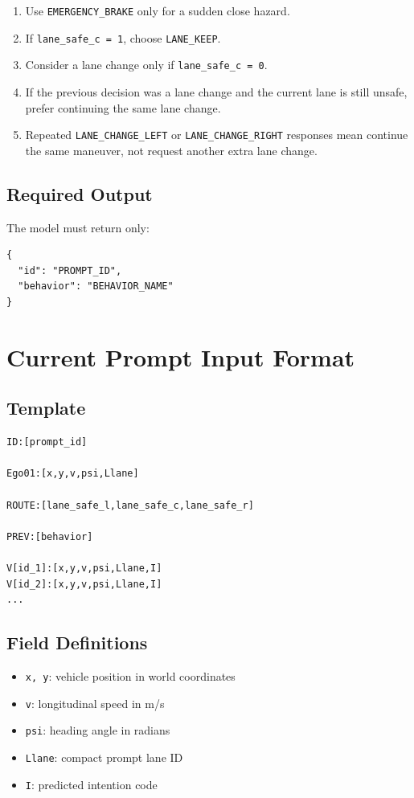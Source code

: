 \documentclass[11pt]{article}
\begin{document}
\begin{enumerate}
    \item Use \texttt{EMERGENCY\_BRAKE} only for a sudden close hazard.
    \item If \texttt{lane\_safe\_c = 1}, choose \texttt{LANE\_KEEP}.
    \item Consider a lane change only if \texttt{lane\_safe\_c = 0}.
    \item If the previous decision was a lane change and the current lane is
    still unsafe, prefer continuing the same lane change.
    \item Repeated \texttt{LANE\_CHANGE\_LEFT} or
    \texttt{LANE\_CHANGE\_RIGHT} responses mean continue the same maneuver,
    not request another extra lane change.
\end{enumerate}

\subsection{Required Output}

The model must return only:

\begin{lstlisting}[style=codestyle]
{
  "id": "PROMPT_ID",
  "behavior": "BEHAVIOR_NAME"
}
\end{lstlisting}

\section{Current Prompt Input Format}

\subsection{Template}

\begin{lstlisting}[style=codestyle]
ID:[prompt_id]

Ego01:[x,y,v,psi,Llane]

ROUTE:[lane_safe_l,lane_safe_c,lane_safe_r]

PREV:[behavior]

V[id_1]:[x,y,v,psi,Llane,I]
V[id_2]:[x,y,v,psi,Llane,I]
...
\end{lstlisting}

\subsection{Field Definitions}

\begin{itemize}
    \item \texttt{x, y}: vehicle position in world coordinates
    \item \texttt{v}: longitudinal speed in m/s
    \item \texttt{psi}: heading angle in radians
    \item \texttt{Llane}: compact prompt lane ID
    \item \texttt{I}: predicted intention code
\end{itemize}
\end{document}
